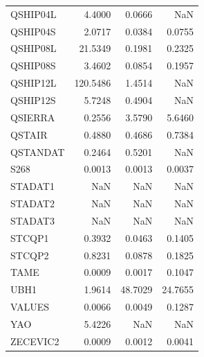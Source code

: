 \begin{longtable}{lrrr}
QSHIP04L &   4.4000 &    0.0666 &     NaN \\
QSHIP04S &   2.0717 &    0.0384 &  0.0755 \\
QSHIP08L &  21.5349 &    0.1981 &  0.2325 \\
QSHIP08S &   3.4602 &    0.0854 &  0.1957 \\
QSHIP12L & 120.5486 &    1.4514 &     NaN \\
QSHIP12S &   5.7248 &    0.4904 &     NaN \\
QSIERRA  &   0.2556 &    3.5790 &  5.6460 \\
QSTAIR   &   0.4880 &    0.4686 &  0.7384 \\
QSTANDAT &   0.2464 &    0.5201 &     NaN \\
S268     &   0.0013 &    0.0013 &  0.0037 \\
STADAT1  &      NaN &       NaN &     NaN \\
STADAT2  &      NaN &       NaN &     NaN \\
STADAT3  &      NaN &       NaN &     NaN \\
STCQP1   &   0.3932 &    0.0463 &  0.1405 \\
STCQP2   &   0.8231 &    0.0878 &  0.1825 \\
TAME     &   0.0009 &    0.0017 &  0.1047 \\
UBH1     &   1.9614 &   48.7029 & 24.7655 \\
VALUES   &   0.0066 &    0.0049 &  0.1287 \\
YAO      &   5.4226 &       NaN &     NaN \\
ZECEVIC2 &   0.0009 &    0.0012 &  0.0041 \\
\end{longtable}
